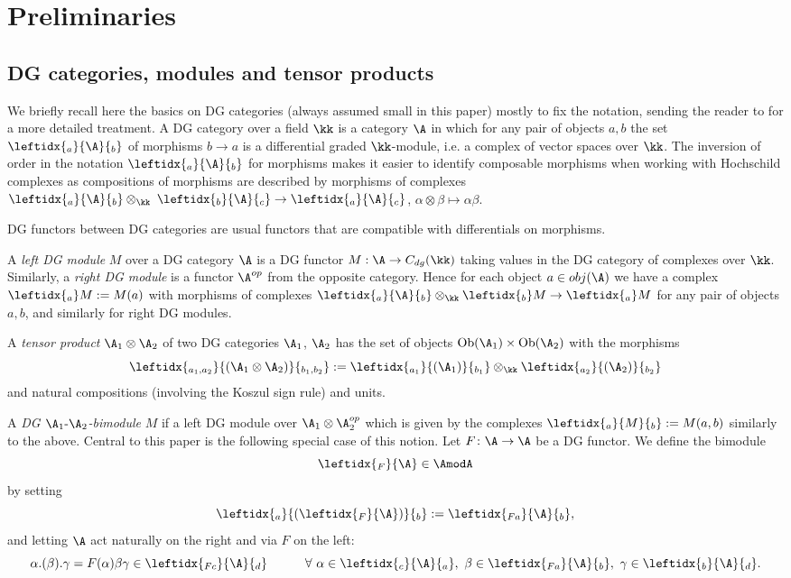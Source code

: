 \documentclass[12pt,a4paper,reqno]{amsart}
\DeclareMathOperator{\obj}{Ob}
\begin{document}
\section{Preliminaries}
\label{section-preliminaries}

\subsection{DG categories, modules and tensor products}

We briefly recall here the basics on DG categories (always assumed small in 
this paper) mostly to fix the notation, sending the reader to \cite{Keller-OnDifferentialGradedCategories}
for a more detailed treatment. 
A DG category over a field $\kk$ is a category $\A$ in which for any 
pair of objects $a, b$ the set $\leftidx{_a}{{\A}}{_b}$ of morphisms
$b \to a$ is a differential graded $\kk$-module, i.e. a complex of 
vector spaces over $\kk$. The inversion of order in the notation 
$\leftidx{_a}{{\A}}{_b}$ for morphisms makes it easier to identify composable morphisms
when working with Hochschild complexes
as compositions of morphisms are described by 
morphisms of complexes $\leftidx{_a}{{\A}}{_b} \otimes_\kk \;\leftidx{_b}{{\A}}{_c}
\to \leftidx{_a}{{\A}}{_c}$,  $\alpha \otimes \beta \mapsto \alpha \beta$. 

DG functors between DG categories are usual functors that are compatible with 
differentials on morphisms. 

A \textit{left DG module} $M$ over a DG category $\A$ is a DG functor 
$M: \A \to C_{dg}(\kk)$ taking values in the DG category of complexes over
$\kk$. Similarly, a \textit{right DG module} is a functor $\A^{op}$ from the opposite 
category. Hence for each object $a \in obj(\A)$ we have a complex 
$\leftidx{_a}M := M(a)$ with morphisms of complexes $\leftidx{_a}{{\A}}{_b}
\otimes_\kk \leftidx{_b}M \to \leftidx{_a}M$ for any pair of objects $a, b$, and 
similarly for right DG modules. 

A \textit{tensor product} $\A_1 \otimes \A_2$
of two DG categories $\A_1$, $\A_2$ has the set of objects
$\obj(\A_1) \times \obj(\A_2)$ with the morphisms
$$
\leftidx{_{a_1, a_2}}{{\left(\A_1 \otimes \A_2\right)}}{_{b_1, b_2}} := 
\leftidx{_{a_1}}{{\left(\A_1\right)}}{_{b_1}} \otimes_\kk\leftidx{_{a_2}}{{\left(\A_2\right)}}{_{b_2}}
$$
and natural compositions (involving the Koszul sign rule) and units. 

A \textit{DG $\A_1\text{-}\A_2$-bimodule} $M$ if a left DG module over $\A_1 \otimes \A_2^{op}$ which is
given by the complexes $\leftidx{_a}{{M}}{_b}: = M(a, b)$ similarly to the above. 
Central to this paper is the following special case of this notion. 
Let $F\colon \A \rightarrow \A$ be a DG functor. We define the bimodule
$$ \leftidx{_F}{\A} \in \AmodA $$
by setting 
$$ \leftidx{_a}{\left(\leftidx{_F}{\A}\right)}{_b} := 
\leftidx{_{Fa}}{{\A}}{_b}, $$
and letting $\A$ act naturally on the right and via $F$ on the left: 
$$ \alpha.(\beta).\gamma = F(\alpha) \beta \gamma \in \leftidx{_{Fc}}{{\A}}{_d} \quad \quad \quad 
\forall\ \alpha \in \leftidx{_c}{{\A}}{_a},\ 
\beta \in \leftidx{_{Fa}}{{\A}}{_b},\  \gamma
\in \leftidx{_b}{{\A}}{_d}. $$
\end{document}
